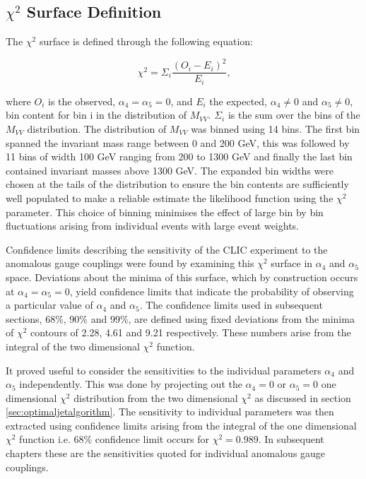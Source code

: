\subsection{$\chi^{2}$ Surface Definition}
\label{sec:chi2surfacedefinition}
The $\chi^{2}$ surface is defined through the following equation:

\begin{equation}
\chi^{2} = \Sigma_{i} \frac{(O_{i} - E_{i})^{2}}{E_{i}} \text{,}
\end{equation}

\noindent where $O_{i}$ is the observed, $\alpha_{4} = \alpha_{5} = 0$, and $E_{i}$ the expected, $\alpha_{4} \neq 0$ and $\alpha_{5} \neq 0$, bin content for bin i in the distribution of $M_{VV}$.  $\Sigma_{i}$ is the sum over the bins of the $M_{VV}$ distribution.  The distribution of $M_{VV}$ was binned using 14 bins.  The first bin spanned the invariant mass range between 0 and 200 GeV, this was followed by 11 bins of width 100 GeV ranging from 200 to 1300 GeV and finally the last bin contained invariant masses above 1300 GeV.  The expanded bin widths were chosen at the tails of the distribution to ensure the bin contents are sufficiently well populated to make a reliable estimate the likelihood function using the $\chi^{2}$ parameter.  This choice of binning minimises the effect of large bin by bin fluctuations arising from individual events with large event weights.

Confidence limits describing the sensitivity of the CLIC experiment to the anomalous gauge couplings were found by examining this $\chi^{2}$ surface in $\alpha_{4}$ and $\alpha_{5}$ space.  Deviations about the minima of this surface, which by construction occurs at $\alpha_{4} = \alpha_{5} = 0$, yield confidence limits that indicate the probability of observing a particular value of $\alpha_{4}$ and $\alpha_{5}$.  The confidence limits used in subsequent sections, 68\%, 90\% and 99\%, are defined using fixed deviations from the minima of $\chi^{2}$ contours of 2.28, 4.61 and 9.21 respectively.  These numbers arise from the integral of the two dimensional $\chi^{2}$ function.

It proved useful to consider the sensitivities to the individual parameters $\alpha_{4}$ and $\alpha_{5}$ independently.  This was done by projecting out the $\alpha_{4} = 0$ or $\alpha_{5} = 0$ one dimensional $\chi^{2}$ distribution from the two dimensional $\chi^{2}$ as discussed in section \ref{sec:optimaljetalgorithm}.  The sensitivity to individual parameters was then extracted using confidence limits arising from the integral of the one dimensional $\chi^{2}$ function i.e. 68\% confidence limit occurs for $\chi^{2} = 0.989$.  In subsequent chapters these are the sensitivities quoted for individual anomalous gauge couplings. 

